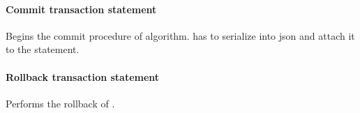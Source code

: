 \paragraph{Commit transaction statement} 
Begins the commit procedure of \mpt algorithm. \client has to serialize \txState into json and attach it to the statement.


\paragraph{Rollback transaction statement} 
Performs the rollback of \transaction. 






